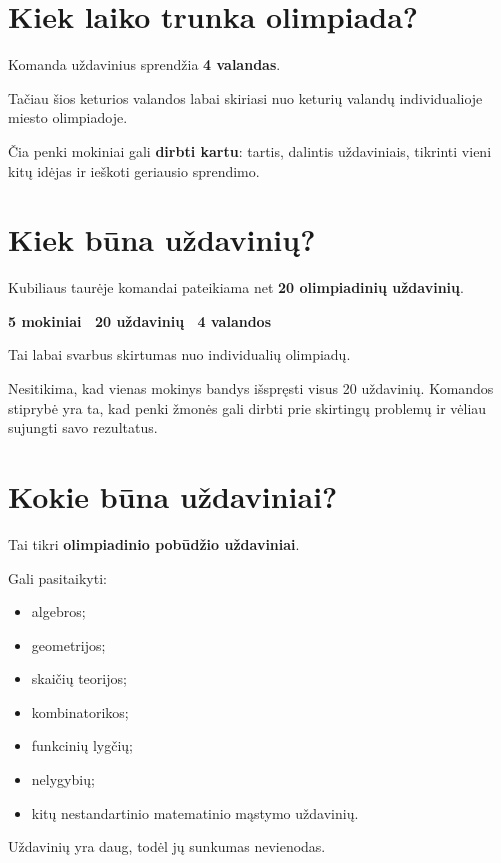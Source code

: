 \documentclass[11pt,a4paper]{article}
\begin{document}
\section{Kiek laiko trunka olimpiada?}

Komanda uždavinius sprendžia \textbf{4 valandas}.

Tačiau šios keturios valandos labai skiriasi nuo keturių valandų individualioje miesto olimpiadoje.

Čia penki mokiniai gali \textbf{dirbti kartu}: tartis, dalintis uždaviniais, tikrinti vieni kitų idėjas ir ieškoti geriausio sprendimo.

\section{Kiek būna uždavinių?}

Kubiliaus taurėje komandai pateikiama net \textbf{20 olimpiadinių uždavinių}.

\begin{infobox}
\centering
\textbf{5 mokiniai \textrightarrow\ 20 uždavinių \textrightarrow\ 4 valandos}
\end{infobox}

Tai labai svarbus skirtumas nuo individualių olimpiadų.

Nesitikima, kad vienas mokinys bandys išspręsti visus 20 uždavinių. Komandos stiprybė yra ta, kad penki žmonės gali dirbti prie skirtingų problemų ir vėliau sujungti savo rezultatus.

\section{Kokie būna uždaviniai?}

Tai tikri \textbf{olimpiadinio pobūdžio uždaviniai}.

Gali pasitaikyti:
\begin{itemize}
  \item algebros;
  \item geometrijos;
  \item skaičių teorijos;
  \item kombinatorikos;
  \item funkcinių lygčių;
  \item nelygybių;
  \item kitų nestandartinio matematinio mąstymo uždavinių.
\end{itemize}

Uždavinių yra daug, todėl jų sunkumas nevienodas.
\end{document}
